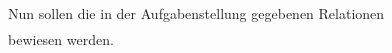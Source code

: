 Nun sollen die in der Aufgabenstellung gegebenen Relationen
\begin{eqnarray}

\end{eqnarray}
bewiesen werden.
